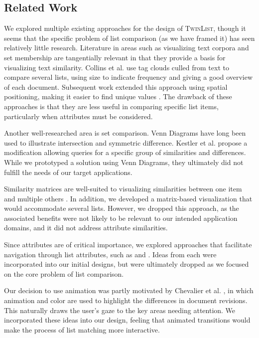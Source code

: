 \documentclass{chi2009}
\newcommand{\TwinList}{\textsc{TwinList}}
\begin{document}
\subsection{Related Work}
We explored multiple existing approaches for the design of \TwinList, though it seems that the specific problem of list comparison (as we have framed it) has seen relatively little research. Literature in areas such as visualizing text corpora and set membership are tangentially relevant in that they provide a basis for visualizing text similarity.  Collins et al. \cite{collins2009parallel} use tag clouds culled from text to compare several lists, using size to indicate frequency and giving a good overview of each document. Subsequent work extended this approach using spatial positioning, making it easier to find unique values \cite{conwaytuscon11}. The drawback of these approaches is that they are less useful in comparing specific list items, particularly when attributes must be considered.

Another well-researched area is set comparison. Venn Diagrams have long been used to illustrate intersection and symmetric difference. Kestler et al. \cite{kestler2005generalized} propose a modification allowing queries for a specific group of similarities and differences. While we prototyped a solution using Venn Diagrams, they ultimately did not fulfill the needs of our target applications.

Similarity matrices are well-suited to visualizing similarities between one item and multiple others \cite{CornelissenPCODA2007}. In addition, we developed a matrix-based visualization that would accommodate several lists. However, we dropped this approach, as the associated benefits were not likely to be relevant to our intended application domains, and it did not address attribute similarities.

Since attributes are of critical importance, we explored approaches that facilitate navigation through list attributes, such as \cite{Chimera:1992:VBI:142750.142817} and \cite{Masui98lensbar}. Ideas from each were incorporated into our initial designs, but were ultimately dropped as we focused on the core problem of list comparison.

Our decision to use animation was partly motivated by Chevalier et al. \cite{diffmation10}, in which animation and color are used to highlight the differences in document revisions. This naturally draws the user's gaze to the key areas needing attention. We incorporated these ideas into our design, feeling that animated transitions would make the process of list matching more interactive.
\end{document}
